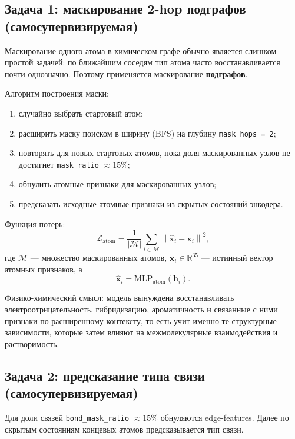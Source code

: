 \documentclass[11pt]{article}
\begin{document}
\subsection{Задача 1: маскирование 2-hop подграфов (самосупервизируемая)}

Маскирование одного атома в химическом графе обычно является слишком простой задачей: по ближайшим соседям тип атома часто восстанавливается почти однозначно. Поэтому применяется маскирование \textbf{подграфов}.

Алгоритм построения маски:
\begin{enumerate}
  \item случайно выбрать стартовый атом;
  \item расширить маску поиском в ширину (BFS) на глубину \texttt{mask\_hops = 2};
  \item повторять для новых стартовых атомов, пока доля маскированных узлов не достигнет \texttt{mask\_ratio} $\approx 15\%$;
  \item обнулить атомные признаки для маскированных узлов;
  \item предсказать исходные атомные признаки из скрытых состояний энкодера.
\end{enumerate}

Функция потерь:
\begin{equation*}
\mathcal{L}_{\text{atom}} = \frac{1}{|\mathcal{M}|} \sum_{i \in \mathcal{M}}
\left\| \hat{\mathbf{x}}_i - \mathbf{x}_i \right\|^2,
\end{equation*}
где $\mathcal{M}$ --- множество маскированных атомов, $\mathbf{x}_i \in \mathbb{R}^{35}$ --- истинный вектор атомных признаков, а
\begin{equation*}
\hat{\mathbf{x}}_i = \mathrm{MLP}_{\text{atom}}(\mathbf{h}_i).
\end{equation*}

Физико-химический смысл: модель вынуждена восстанавливать электроотрицательность, гибридизацию, ароматичность и связанные с ними признаки по расширенному контексту, то есть учит именно те структурные зависимости, которые затем влияют на межмолекулярные взаимодействия и растворимость.

\subsection{Задача 2: предсказание типа связи (самосупервизируемая)}

Для доли связей \texttt{bond\_mask\_ratio} $\approx 15\%$ обнуляются edge-features. Далее по скрытым состояниям концевых атомов предсказывается тип связи.
\end{document}
